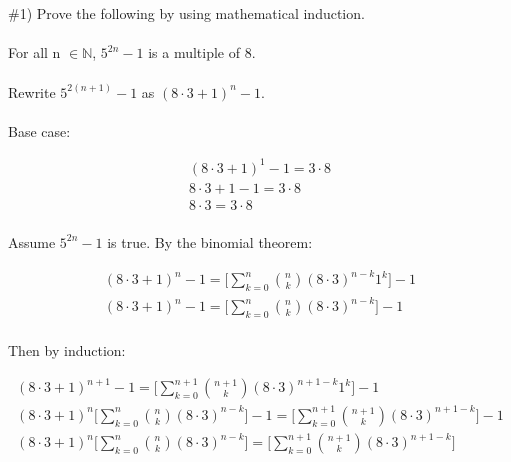 \documentclass[11pt]{article}
\begin{document}

\section{}

\#1) Prove the following by using mathematical induction.

\paragraph{}

For all n $\in \mathbb{N}$, $5^{2n}-1$ is a multiple of 8.

\paragraph{}

Rewrite $5^{2(n+1)}-1$ as $(8\cdot3 + 1)^n-1$.
\paragraph{}
Base case:

\begin{equation}
	\begin{aligned}
		(8\cdot3+1)^1-1=3\cdot8 \\
		8\cdot3+1-1=3\cdot8 \\
		8\cdot3=3\cdot8 \\
	\end{aligned}
\end{equation}

Assume $5^{2n}-1$ is true.  By the binomial theorem:

\begin{equation}
	\begin{aligned}
		(8\cdot3+1)^n-1=\bigg[\sum_{k=0}^{n} \binom{n}{k}(8\cdot3)^{n-k}1^k\bigg] - 1 \\
		(8\cdot3+1)^n-1=\bigg[\sum_{k=0}^{n} \binom{n}{k}(8\cdot3)^{n-k}\bigg] - 1 \\
	\end{aligned}
\end{equation}

Then by induction:

\begin{equation}
	\begin{aligned}
		(8\cdot3+1)^{n+1}-1=\bigg[\sum_{k=0}^{n+1} \binom{n+1}{k}(8\cdot3)^{n+1-k}1^k\bigg] - 1 \\
		(8\cdot3+1)^{n}\bigg[\sum_{k=0}^{n} \binom{n}{k}(8\cdot3)^{n-k}\bigg] - 1 =\bigg[\sum_{k=0}^{n+1} \binom{n+1}{k}(8\cdot3)^{n+1-k}\bigg] - 1 \\
		(8\cdot3+1)^{n}\bigg[\sum_{k=0}^{n} \binom{n}{k}(8\cdot3)^{n-k}\bigg] =\bigg[\sum_{k=0}^{n+1} \binom{n+1}{k}(8\cdot3)^{n+1-k}\bigg] \\
	\end{aligned}
\end{equation}
\end{document}
